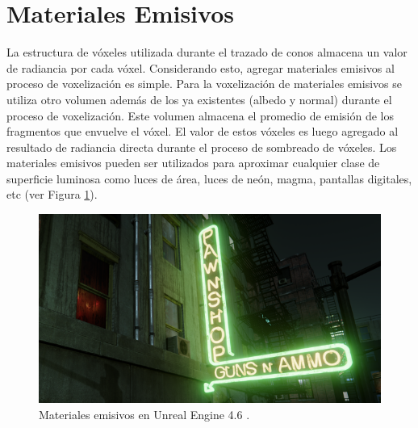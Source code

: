 \section{Materiales Emisivos} %
\label{sec:materiales_emisivos}
La estructura de vóxeles utilizada durante el trazado de conos almacena un valor de radiancia por cada vóxel. Considerando esto, agregar materiales emisivos al proceso de voxelización es simple. Para la voxelización de materiales emisivos se utiliza otro volumen además de los ya existentes (albedo y normal) durante el proceso de voxelización. Este volumen almacena el promedio de emisión de los fragmentos que envuelve el vóxel. El valor de estos vóxeles es luego agregado al resultado de radiancia directa durante el proceso de sombreado de vóxeles. Los materiales emisivos pueden ser utilizados para aproximar cualquier clase de superficie luminosa como luces de área, luces de neón, magma, pantallas digitales, etc (ver Figura \ref{fig:emissive_mat}).

\begin{figure}[H]
	\centering
	\captionsetup{justification=centering}
	\includegraphics[width=0.95\linewidth]{media/emissive_neon.png}
	\caption{Materiales emisivos en Unreal Engine 4.6 \cite{unreal_46}.}
	\label{fig:emissive_mat}
\end{figure}